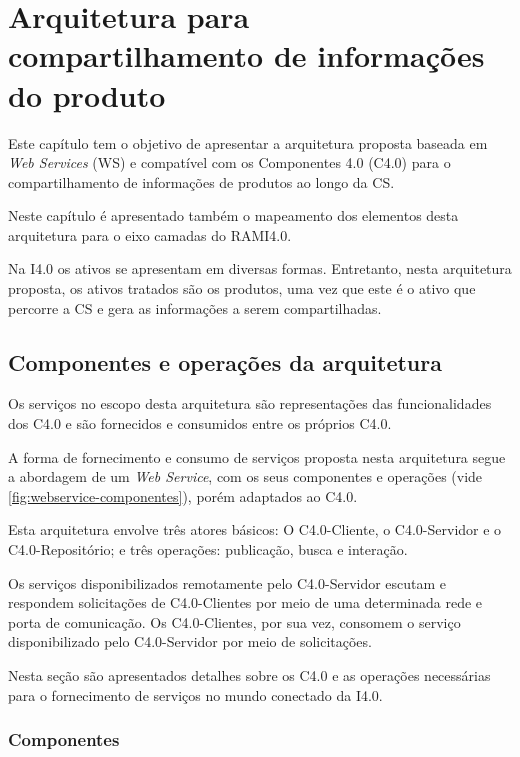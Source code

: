 \chapter{Arquitetura para compartilhamento de informações do produto}
\label{cha:arquitetura}

Este capítulo tem o objetivo de apresentar a arquitetura proposta baseada em \textit{Web Services} (WS) e compatível com os Componentes 4.0 (C4.0) para o compartilhamento de informações de produtos ao longo da CS.

Neste capítulo é apresentado também o mapeamento dos elementos desta arquitetura para o eixo camadas do RAMI4.0.

Na I4.0 os ativos se apresentam em diversas formas. Entretanto, nesta arquitetura proposta, os ativos tratados são os produtos, uma vez que este é o ativo que percorre a CS e gera as informações a serem compartilhadas.

\section{Componentes e operações da arquitetura}
\label{sec:componentes-e-operacoes}

Os serviços no escopo desta arquitetura são representações das funcionalidades dos C4.0 e são fornecidos e consumidos entre os próprios C4.0.

A forma de fornecimento e consumo de serviços proposta nesta arquitetura segue a abordagem de um \textit{Web Service}, com os seus componentes e operações (vide \autoref{fig:webservice-componentes}), porém adaptados ao C4.0.

Esta arquitetura envolve três atores básicos: O C4.0-Cliente, o C4.0-Servidor e o C4.0-Repositório; e três operações: publicação, busca e interação.

Os serviços disponibilizados remotamente pelo C4.0-Servidor escutam e respondem solicitações de C4.0-Clientes por meio de uma determinada rede e porta de comunicação. Os C4.0-Clientes, por sua vez, consomem o serviço disponibilizado pelo C4.0-Servidor por meio de solicitações.

Nesta seção são apresentados detalhes sobre os C4.0 e as operações necessárias para o fornecimento de serviços no mundo conectado da I4.0.

\subsection{Componentes}

